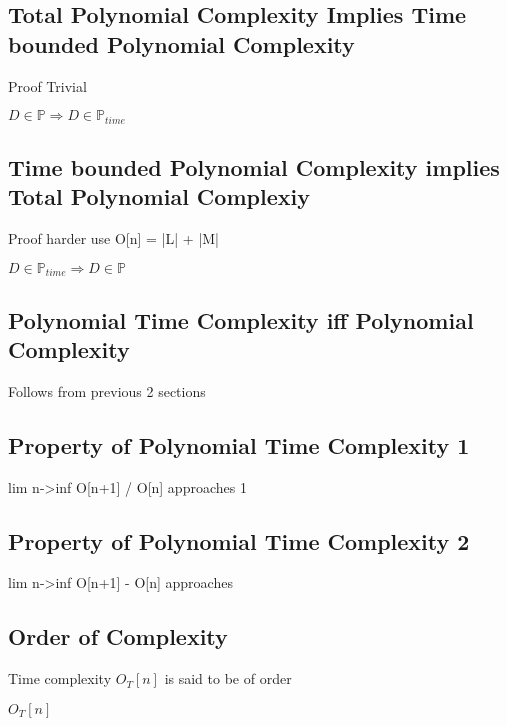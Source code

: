 \documentclass[11pt]{article}
\begin{document}
\subsection{Total Polynomial Complexity Implies Time bounded Polynomial Complexity}
Proof Trivial
\begin{center}
$
D \in \mathbb{P} \Longrightarrow D \in \mathbb{P}_{time}
$
\end{center}






\subsection{Time bounded Polynomial Complexity implies Total Polynomial Complexiy}
Proof harder use O[n] = |L| + |M|
\begin{center}
$
D \in \mathbb{P}_{time} \Longrightarrow D \in \mathbb{P}
$
\end{center}






\subsection{Polynomial Time Complexity iff Polynomial Complexity}
Follows from previous 2 sections




\subsection{Property of Polynomial Time Complexity 1}
lim n->inf O[n+1] / O[n] approaches 1


\subsection{Property of Polynomial Time Complexity 2}
lim n->inf O[n+1] - O[n] approaches




\subsection{Order of Complexity}
Time complexity $O_T[n]$ is said to be of order
\begin{center}
$
O_T[n]
$
\end{center}
\end{document}

